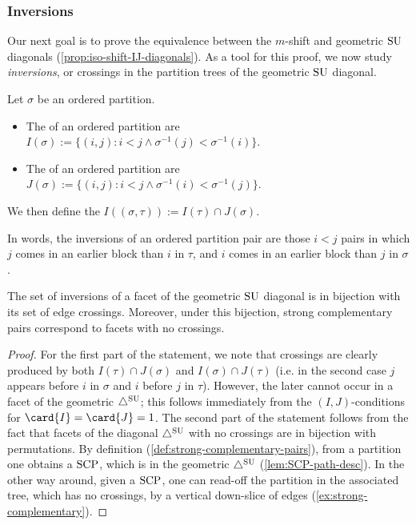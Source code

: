 
\subsubsection{Inversions}
\label{subsec:inversions}

Our next goal is to prove the equivalence between the $m$-shift and geometric $\mathrm{SU}$ diagonals (\cref{prop:iso-shift-IJ-diagonals}).
As a tool for this proof, we now study \emph{inversions}, or crossings in the partition trees of the geometric $\mathrm{SU}$ diagonal.

\begin{definition}\label{def:inverions}
Let $\sigma$ be an ordered partition.
\begin{itemize}
    \item The  of an ordered partition are $I(\sigma):= \{(i,j): i<j \land \sigma^{-1}(j)<\sigma^{-1}(i) \}$.
    \item The  of an ordered partition are $J(\sigma):= \{(i,j): i<j \land \sigma^{-1}(i)< \sigma^{-1}(j) \}$.
\end{itemize}
We then define the  $I((\sigma,\tau)):=I(\tau)\cap J(\sigma)$. 
\end{definition}
In words, the inversions of an ordered partition pair are those $i<j$ pairs in which $j$ comes in an earlier block than $i$ in $\tau$, and $i$ comes in an earlier block than $j$ in $\sigma$. 

\begin{proposition}
\label{p:crossings}
The set of inversions of a facet of the geometric $\mathrm{SU}$ diagonal is in bijection with its set of edge crossings. 
Moreover, under this bijection, strong complementary pairs correspond to facets with no crossings.
\end{proposition}

\begin{proof}
For the first part of the statement,
we note that crossings are clearly produced by both $I(\tau)\cap J(\sigma)$ and $I(\sigma)\cap J(\tau)$ (i.e. in the second case $j$ appears before $i$ in $\sigma$ and $i$ before $j$ in $\tau$).
However, the later cannot occur in a facet of the geometric $\triangle^{\mathrm{SU}}$; this follows immediately from the $(I,J)$-conditions for $\card{I} = \card{J} = 1$. 
The second part of the statement follows from the fact that facets of the diagonal $\triangle^{\mathrm{SU}}$ with no crossings are in bijection with permutations.
By definition (\cref{def:strong-complementary-pairs}), from a partition one obtains a $\mathrm{SCP}$, which is in the geometric $\triangle^{\mathrm{SU}}$ (\cref{lem:SCP-path-desc}). 
In the other way around, given a $\mathrm{SCP}$, one can read-off the partition in the associated tree, which has no crossings, by a vertical down-slice of edges (\cref{ex:strong-complementary}).
\end{proof}

